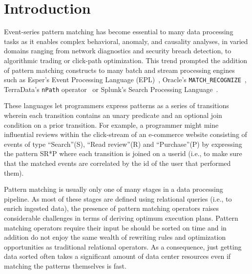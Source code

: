 \section{Introduction}


Event-series pattern matching has become essential to many data processing tasks
as it enables complex behavioral, anomaly, and causality analyses, in varied
domains ranging from network diagnostics and security breach detection, to
algorithmic trading or click-path optimization.  This trend prompted the
addition of pattern matching constructs to many batch and stream processing
engines such as Esper's Event Processing Language (EPL)~\cite{esper_epl},
Oracle's \texttt{MATCH\_RECOGNIZE}~\cite{oracle_mr}, TerraData's \texttt{nPath}
operator~\cite{aster_npath} or Splunk's Search Processing
Language~\cite{Carasso:2012}.

These languages let programmers express patterns as a series of transitions
wherein each transition contains an unary predicate and an optional join
condition on a prior transition.  For example, a programmer might mine
influential reviews within the click-stream of an e-commerce website consisting
of events of type ``Search''(S), ``Read review''(R) and ``Purchase''(P) by
expressing the pattern SR*P where each transition is joined on a userid (i.e.,
to make sure that the matched events are correlated by the id of the user that
performed them).

Pattern matching is usually only one of many stages in a data processing
pipeline.  As most of these stages are defined using relational queries (i.e.,
to enrich ingested data), the presence of pattern matching operators raises
considerable challenges in terms of deriving optimum execution plans.  Pattern
matching operators require their input be should be sorted on time and in
addition do not enjoy the same wealth of rewriting rules and optimization
opportunities as traditional relational operators.  As a consequence, just
getting data sorted often takes a significant amount of data center resources
even if matching the patterns themselves is fast.

